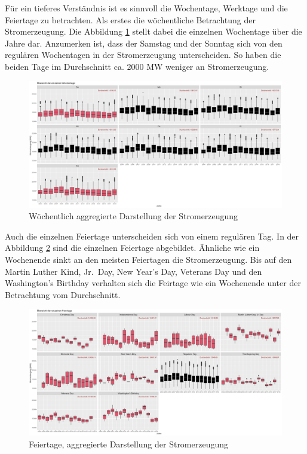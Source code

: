 \documentclass[11pt,ngerman,a4paper,]{article}
\begin{document}
Für ein tieferes Verständnis ist es sinnvoll die Wochentage, Werktage und die Feiertage zu betrachten. Als erstes die wöchentliche Betrachtung der Stromerzeugung. Die Abbildung \ref{fig:weekday_boxplot} stellt dabei die einzelnen Wochentage über die Jahre dar. Anzumerken ist, dass der Samstag und der Sonntag sich von den regulären Wochentagen in der Stromerzeugung unterscheiden. So haben die beiden Tage im Durchschnitt ca. 2000 MW weniger an Stromerzeugung.

\begin{figure}[H]
\centering
\includegraphics[width=1.0\textwidth]{plots/weekday_boxplot.png}
\caption{Wöchentlich aggregierte Darstellung der Stromerzeugung}
\label{fig:weekday_boxplot}
\end{figure}

Auch die einzelnen Feiertage unterscheiden sich von einem regulären Tag. In der Abbildung \ref{fig:holiday_boxplot} sind die einzelnen Feiertage abgebildet. Ähnliche wie ein Wochenende sinkt an den meisten Feiertagen die Stromerzeugung. Bis auf den Martin Luther Kind, Jr.~Day, New Year's Day, Veterans Day und den Washington's Birthday verhalten sich die Feirtage wie ein Wochenende unter der Betrachtung vom Durchschnitt.

\begin{figure}[H]
\centering
\includegraphics[width=1.0\textwidth]{plots/holiday_boxplot}
\caption{Feiertage, aggregierte Darstellung der Stromerzeugung}
\label{fig:holiday_boxplot}
\end{figure}
\end{document}
